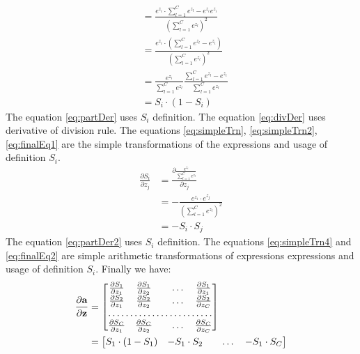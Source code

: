 \documentclass[10pt,a4paper]{article}
\begin{document}
\begin{enumerate}
\begin{align}
&= \frac{e^{z_{i}} \cdot \sum_{l=1}^{C}e^{z_{l}} - e^{z_{i}} e^{z_{i}}}
{\left(\sum_{l=1}^{C}e^{z_{l}}\right)^2}
\label{eq:divDer}\\
&= \frac{e^{z_{i}} \cdot \left(\sum_{l=1}^{C}e^{z_{l}} -  e^{z_{i}}\right)}
{\left(\sum_{l=1}^{C}e^{z_{l}}\right)^2}
\label{eq:simpleTrn}\\
&= \frac{e^{z_{i}}}{\sum_{l=1}^{C}e^{z_{l}}}\frac{ \sum_{l=1}^{C}e^{z_{l}} -  e^{z_{i}}}
{\sum_{l=1}^{C}e^{z_{l}}}
\label{eq:simpleTrn2}\\
&= S_i \cdot (1 - S_i) \label{eq:finalEq1}
\end{align}
The equation \ref{eq:partDer} uses $S_i$ definition. The equation \ref{eq:divDer} uses derivative of division rule. The equations \ref{eq:simpleTrn}, \ref{eq:simpleTrn2}, \ref{eq:finalEq1} are the simple transformations of the expressions and usage of definition $S_i$.
\begin{align}
\frac{\partial S_i}{\partial z_j} &= 
\frac{\partial \frac{ e^{z_{i}}}{\sum_{l=1}^{C}e^{z_{l}}}}{\partial z_j}
\label{eq:partDer2}\\
&=-\frac{e^{z_{i}}\cdot e^{z_{j}}}{\left(\sum_{l=1}^{C}e^{z_{l}}\right)^2} \label{eq:simpleTrn4}\\
&= -S_i \cdot S_j \label{eq:finalEq2}
\end{align}
The equation \ref{eq:partDer2} uses $S_i$ definition.
The equations \ref{eq:simpleTrn4} and \ref{eq:finalEq2} are simple arithmetic transformations of expressions expressions and usage of definition $S_i$.
Finally  we have:
\begin{align}
\frac{\partial \vect{a}}{\partial \vect{z}}  &=
\begin{bmatrix}
    \frac{\partial S_1}{\partial z_1}     & 
    \frac{\partial S_1}{\partial z_2}      &  & \dots & \frac{\partial S_1}{\partial z_1}  \\
    \frac{\partial S_2}{\partial z_1}     & 
    \frac{\partial S_2}{\partial z_2}      &  & \dots & \frac{\partial S_2}{\partial z_C}\\
    \hdotsfor{5} \\
    \frac{\partial S_C}{\partial z_1}     & 
    \frac{\partial S_C}{\partial z_2}      &  & \dots & \frac{\partial S_C}{\partial z_C}\\
\end{bmatrix} \nonumber \\
&=
\begin{bmatrix}
    S_1 \cdot (1- S_1)    & 
-S_1 \cdot S_2      &  & \dots & -S_1\cdot S_C \\

\end{bmatrix}
\end{align}
\end{enumerate}
\end{document}
